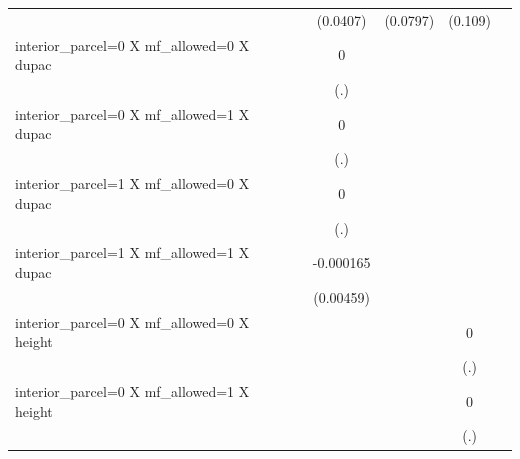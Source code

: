 \begin{table}[htbp]
\begin{tabular}{l*{6}{c}}
                    &                     &                     &    (0.0407)         &    (0.0797)         &     (0.109)         &                     \\
[1em]
interior\_parcel=0 X mf\_allowed=0 X dupac&                     &                     &           0         &                     &                     &                     \\
                    &                     &                     &         (.)         &                     &                     &                     \\
[1em]
interior\_parcel=0 X mf\_allowed=1 X dupac&                     &                     &           0         &                     &                     &                     \\
                    &                     &                     &         (.)         &                     &                     &                     \\
[1em]
interior\_parcel=1 X mf\_allowed=0 X dupac&                     &                     &           0         &                     &                     &                     \\
                    &                     &                     &         (.)         &                     &                     &                     \\
[1em]
interior\_parcel=1 X mf\_allowed=1 X dupac&                     &                     &   -0.000165         &                     &                     &                     \\
                    &                     &                     &   (0.00459)         &                     &                     &                     \\
[1em]
interior\_parcel=0 X mf\_allowed=0 X height&                     &                     &                     &                     &           0         &                     \\
                    &                     &                     &                     &                     &         (.)         &                     \\
[1em]
interior\_parcel=0 X mf\_allowed=1 X height&                     &                     &                     &                     &           0         &                     \\
                    &                     &                     &                     &                     &         (.)         &                     \\

\end{tabular}
\end{table}
